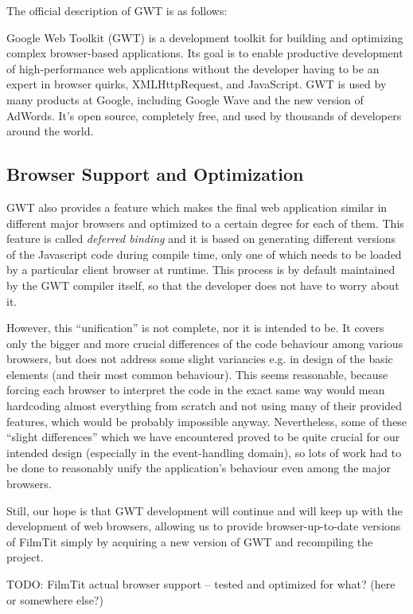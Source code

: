 The official description of GWT is as follows:

Google Web Toolkit (GWT) is a development toolkit for building and optimizing complex browser-based applications. Its goal is to enable productive development of high-performance web applications without the developer having to be an expert in browser quirks, XMLHttpRequest, and JavaScript. GWT is used by many products at Google, including Google Wave and the new version of AdWords. It's open source, completely free, and used by thousands of developers around the world.


\subsection{Browser Support and Optimization}
GWT also provides a feature which makes the final web application similar in different major browsers and optimized to a certain degree for each of them. This feature is called {\em deferred binding} and it is based on generating different versions of the Javascript code during compile time, only one of which needs to be loaded by a particular client browser at runtime. This process is by default maintained by the GWT compiler itself, so that the developer does not have to worry about it.

However, this ``unification'' is not complete, nor it is intended to be. It covers only the bigger and more crucial differences of the code behaviour among various browsers, but does not address some slight variancies e.g. in design of the basic elements (and their most common behaviour). This seems reasonable, because forcing each browser to interpret the code in the exact same way would mean hardcoding almost everything from scratch and not using many of their provided features, which would be probably impossible anyway. Nevertheless, some of these ``slight differences'' which we have encountered proved to be quite crucial for our intended design (especially in the event-handling domain), so lots of work had to be done to reasonably unify the application's behaviour even among the major browsers.

Still, our hope is that GWT development will continue and will keep up with the development of web browsers, allowing us to provide browser-up-to-date versions of FilmTit simply by acquiring a new version of GWT and recompiling the project.

TODO: FilmTit actual browser support -- tested and optimized for what? (here or somewhere else?)


